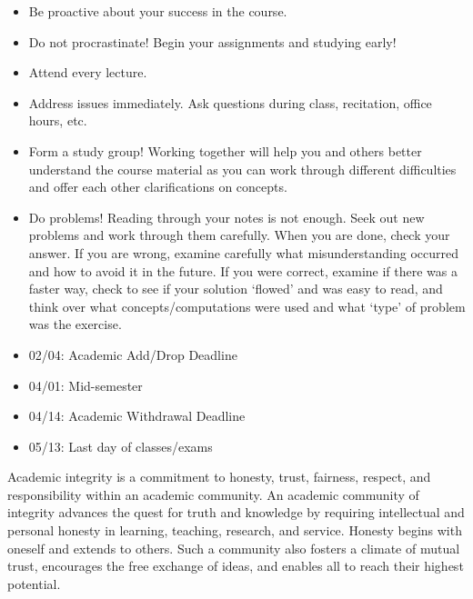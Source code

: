 \documentclass[11pt,letterpaper]{article}
\begin{document}
\begin{itemize} \itemsep=0.3ex
\item Be proactive about your success in the course.
\item Do not procrastinate! Begin your assignments and studying early!
\item Attend every lecture.
\item Address issues immediately. Ask questions during class, recitation, office hours, etc. 
\item Form a study group! Working together will help you and others better understand the course material as you can work through different difficulties and offer each other clarifications on concepts.
\item Do problems! Reading through your notes is not enough. Seek out new problems and work through them carefully. When you are done, check your answer. If you are wrong, examine carefully what misunderstanding occurred and how to avoid it in the future. If you were correct, examine if there was a faster way, check to see if your solution `flowed' and was easy to read, and think over what concepts/computations were used and what `type' of problem was the exercise.
\end{itemize}
\sectionbreak



\begin{itemize} \itemsep=0.3ex
\item 02/04: Academic Add/Drop Deadline
\item 04/01: Mid-semester
\item 04/14: Academic Withdrawal Deadline
\item 05/13: Last day of classes/exams
\end{itemize}
\sectionbreak








Academic integrity is a commitment to honesty, trust, fairness, respect, and responsibility within an academic community. An academic community of integrity advances the quest for truth and knowledge by requiring intellectual and personal honesty in learning, teaching, research, and service. Honesty begins with oneself and extends to others. Such a community also fosters a climate of mutual trust, encourages the free exchange of ideas, and enables all to reach their highest potential. \pspace
\end{document}
